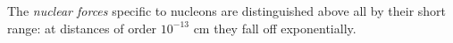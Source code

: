 The \emph{nuclear forces} specific to nucleons are distinguished above all by their short range: at distances of order $10^{-13}$ cm they fall off exponentially.
